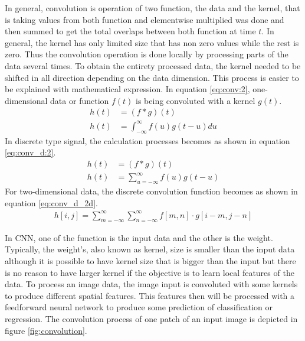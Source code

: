     In general, convolution is operation of two function, the data and
    the kernel, that is taking values from both function and
    elementwise multiplied was done and then summed to get the total
    overlaps between both function at time $t$. In general, the kernel
    has only limited size that has non zero values while the rest is
    zero. Thus the convolution operation is done locally by processing
    parts of the data several times. To obtain the entirety processed
    data, the kernel needed to be shifted in all direction depending
    on the data dimension. This process is easier to be explained with
    mathematical expression. In equation \ref{eq:conv:2},
    one-dimensional data or function $f(t)$ is being convoluted with a
    kernel $g(t)$.
    \begin{align}
        \label{eq:conv:1}
        h(t) &= (f * g)(t)\\
        \label{eq:conv:2}
        h(t) &= \int_{-\infty}^\infty f(u)g(t-u) du
    \end{align}
    In discrete type signal, the calculation processes becomes as
    shown in equation \ref{eq:conv_d:2}.
    \begin{align}
        \label{eq:conv_d:1}
        h(t) &= (f * g)(t)\\
        \label{eq:conv_d:2}
        h(t) &= \sum_{u = -\infty}^{\infty} f(u)g(t-u)
    \end{align}
    For two-dimensional data, the discrete convolution function
    becomes as shown in equation \ref{eq:conv_d_2d}.
    \begin{align}
        \label{eq:conv_d_2d}
        h[i, j] = \sum_{m = -\infty}^{\infty}\sum_{n = -\infty}^{\infty}f[m, n]\cdot g[i-m, j-n]
    \end{align}

    In CNN, one of the function is the input data and the other is the
    weight. Typically, the weight's, also known as kernel, size is
    smaller than the input data although it is possible to have kernel
    size that is bigger than the input but there is no reason to have
    larger kernel if the objective is to learn local features of the
    data. To process an image data, the image input is convoluted with
    some kernels to produce different spatial features. This features
    then will be processed with a feedforward neural network to
    produce some prediction of classification or regression. The
    convolution process of one patch of an input image is depicted in
    figure \ref{fig:convolution}.
    
